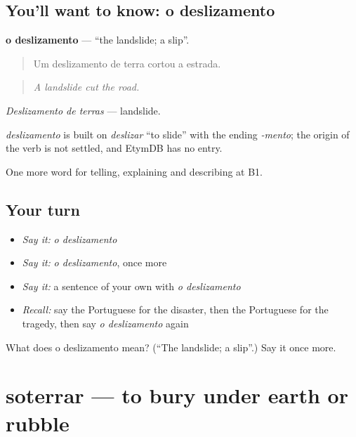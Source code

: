 \subsection*{You'll want to know: o deslizamento}
\textbf{o deslizamento} — \textquotedblleft{}the landslide; a slip\textquotedblright{}.

\begin{quote}
Um deslizamento de terra cortou a estrada.
\end{quote}

\begin{quote}
\emph{A landslide cut the road.}
\end{quote}

\emph{Deslizamento de terras} — landslide.

\begin{cousinweb}
\emph{deslizamento} is built on \emph{deslizar} \textquotedblleft{}to slide\textquotedblright{} with the ending \emph{-mento}; the origin of the verb is not settled, and EtymDB has no entry.
\end{cousinweb}

\begin{grammarlens}[title={What you've built}]
One more word for telling, explaining and describing at B1.
\end{grammarlens}

\subsection*{Your turn}
\begin{itemize}
\raggedright
  \item \emph{Say it:} \emph{o deslizamento}
  \item \emph{Say it:} \emph{o deslizamento}, once more
  \item \emph{Say it:} a sentence of your own with \emph{o deslizamento}
  \item \emph{Recall:} say the Portuguese for the disaster, then the Portuguese for the tragedy, then say \emph{o deslizamento} again
\end{itemize}

\begin{tcolorbox}[breakable,colback=teal!4,colframe=teal!35!black,title={Before you move on}]
What does o deslizamento mean? (\textquotedblleft{}The landslide; a slip\textquotedblright{}.) Say it once more.
\end{tcolorbox}
\section[soterrar]{soterrar — to bury under earth or rubble}

